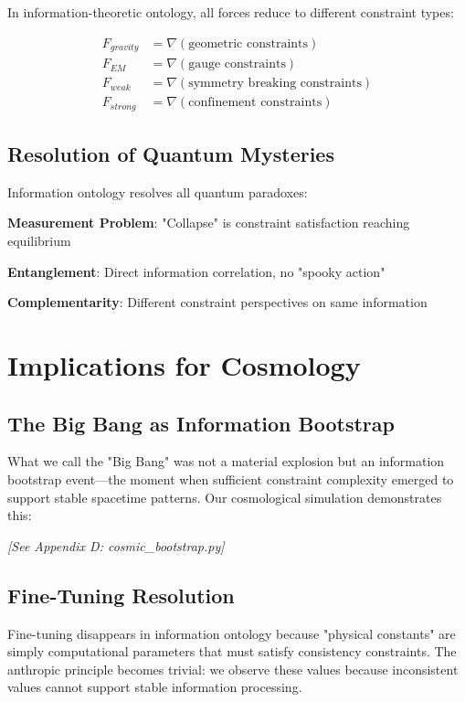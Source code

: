 \documentclass[12pt]{article}
\begin{document}
In information-theoretic ontology, all forces reduce to different constraint types:

\begin{align}
F_{gravity} &= \nabla(\text{geometric constraints}) \\
F_{EM} &= \nabla(\text{gauge constraints}) \\
F_{weak} &= \nabla(\text{symmetry breaking constraints}) \\
F_{strong} &= \nabla(\text{confinement constraints})
\end{align}

\subsection{Resolution of Quantum Mysteries}

Information ontology resolves all quantum paradoxes:

\textbf{Measurement Problem}: "Collapse" is constraint satisfaction reaching equilibrium

\textbf{Entanglement}: Direct information correlation, no "spooky action"

\textbf{Complementarity}: Different constraint perspectives on same information

\section{Implications for Cosmology}

\subsection{The Big Bang as Information Bootstrap}

What we call the "Big Bang" was not a material explosion but an information bootstrap event—the moment when sufficient constraint complexity emerged to support stable spacetime patterns. Our cosmological simulation demonstrates this:

\textit{[See Appendix D: cosmic\_bootstrap.py]}

\subsection{Fine-Tuning Resolution}

Fine-tuning disappears in information ontology because "physical constants" are simply computational parameters that must satisfy consistency constraints. The anthropic principle becomes trivial: we observe these values because inconsistent values cannot support stable information processing.
\end{document}
